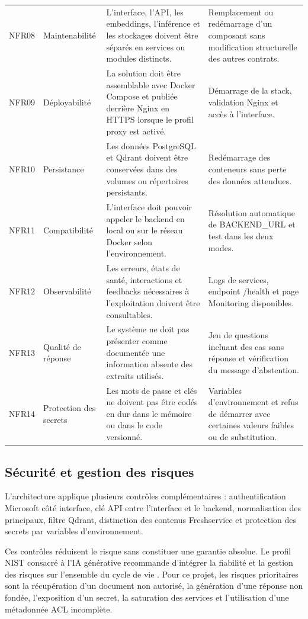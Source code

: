 \begin{table}[H]
\begin{tabular}{p{1.2cm}p{2cm}p{6.4cm}p{4.1cm}}
NFR08 & Maintenabilité & L'interface, l'API, les embeddings, l'inférence et les stockages doivent être séparés en services ou modules distincts. & Remplacement ou redémarrage d'un composant sans modification structurelle des autres contrats. \\
NFR09 & Déployabilité & La solution doit être assemblable avec Docker Compose et publiée derrière Nginx en HTTPS lorsque le profil proxy est activé. & Démarrage de la stack, validation Nginx et accès à l'interface. \\
NFR10 & Persistance & Les données PostgreSQL et Qdrant doivent être conservées dans des volumes ou répertoires persistants. & Redémarrage des conteneurs sans perte des données attendues. \\
NFR11 & Compatibilité & L'interface doit pouvoir appeler le backend en local ou sur le réseau Docker selon l'environnement. & Résolution automatique de BACKEND\_URL et test dans les deux modes. \\
NFR12 & Observabilité & Les erreurs, états de santé, interactions et feedbacks nécessaires à l'exploitation doivent être consultables. & Logs de services, endpoint /health et page Monitoring disponibles. \\
NFR13 & Qualité de réponse & Le système ne doit pas présenter comme documentée une information absente des extraits utilisés. & Jeu de questions incluant des cas sans réponse et vérification du message d'abstention. \\
NFR14 & Protection des secrets & Les mots de passe et clés ne doivent pas être codés en dur dans le mémoire ou dans le code versionné. & Variables d'environnement et refus de démarrer avec certaines valeurs faibles ou de substitution. \\
\bottomrule
\end{tabular}
\end{table}

\subsection{Sécurité et gestion des risques}

L'architecture applique plusieurs contrôles complémentaires : authentification Microsoft côté interface, clé API entre l'interface et le backend, normalisation des principaux, filtre Qdrant, distinction des contenus Freshservice et protection des secrets par variables d'environnement.

Ces contrôles réduisent le risque sans constituer une garantie absolue. Le profil NIST consacré à l'IA générative recommande d'intégrer la fiabilité et la gestion des risques sur l'ensemble du cycle de vie \citep{NISTGAI2024}. Pour ce projet, les risques prioritaires sont la récupération d'un document non autorisé, la génération d'une réponse non fondée, l'exposition d'un secret, la saturation des services et l'utilisation d'une métadonnée ACL incomplète.

